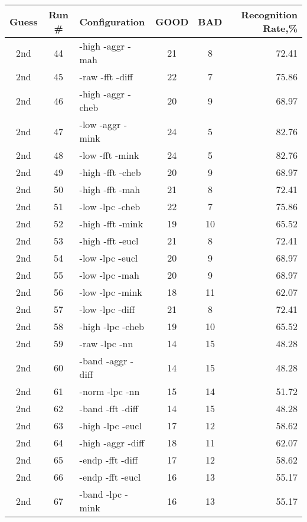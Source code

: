 \begin{table}
\begin{minipage}[b]{\textwidth}
\centering
\begin{tabular}{|c|c|l|c|c|r|} \hline
Guess & Run \# & Configuration & GOOD & BAD & Recognition Rate,\%\\ \hline\hline
2nd & 44 & -high -aggr -mah  & 21 & 8 & 72.41\\ \hline
2nd & 45 & -raw -fft -diff  & 22 & 7 & 75.86\\ \hline
2nd & 46 & -high -aggr -cheb  & 20 & 9 & 68.97\\ \hline
2nd & 47 & -low -aggr -mink  & 24 & 5 & 82.76\\ \hline
2nd & 48 & -low -fft -mink  & 24 & 5 & 82.76\\ \hline
2nd & 49 & -high -fft -cheb  & 20 & 9 & 68.97\\ \hline
2nd & 50 & -high -fft -mah  & 21 & 8 & 72.41\\ \hline
2nd & 51 & -low -lpc -cheb  & 22 & 7 & 75.86\\ \hline
2nd & 52 & -high -fft -mink  & 19 & 10 & 65.52\\ \hline
2nd & 53 & -high -fft -eucl  & 21 & 8 & 72.41\\ \hline
2nd & 54 & -low -lpc -eucl  & 20 & 9 & 68.97\\ \hline
2nd & 55 & -low -lpc -mah  & 20 & 9 & 68.97\\ \hline
2nd & 56 & -low -lpc -mink  & 18 & 11 & 62.07\\ \hline
2nd & 57 & -low -lpc -diff  & 21 & 8 & 72.41\\ \hline
2nd & 58 & -high -lpc -cheb  & 19 & 10 & 65.52\\ \hline
2nd & 59 & -raw -lpc -nn  & 14 & 15 & 48.28\\ \hline
2nd & 60 & -band -aggr -diff  & 14 & 15 & 48.28\\ \hline
2nd & 61 & -norm -lpc -nn  & 15 & 14 & 51.72\\ \hline
2nd & 62 & -band -fft -diff  & 14 & 15 & 48.28\\ \hline
2nd & 63 & -high -lpc -eucl  & 17 & 12 & 58.62\\ \hline
2nd & 64 & -high -aggr -diff  & 18 & 11 & 62.07\\ \hline
2nd & 65 & -endp -fft -diff  & 17 & 12 & 58.62\\ \hline
2nd & 66 & -endp -fft -eucl  & 16 & 13 & 55.17\\ \hline
2nd & 67 & -band -lpc -mink  & 16 & 13 & 55.17\\ \hline

\end{tabular}
\end{minipage}
\end{table}
